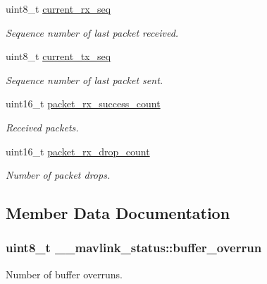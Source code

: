 \begin{DoxyCompactItemize}
uint8\+\_\+t \hyperlink{struct____mavlink__status_affbdd32b3dff8ae35327a79ed6b17646}{current\+\_\+rx\+\_\+seq}
\begin{DoxyCompactList}\small\item\em Sequence number of last packet received. \end{DoxyCompactList}\item 
uint8\+\_\+t \hyperlink{struct____mavlink__status_a06482d6c3fbfa829526c9b2e2e895f32}{current\+\_\+tx\+\_\+seq}
\begin{DoxyCompactList}\small\item\em Sequence number of last packet sent. \end{DoxyCompactList}\item 
uint16\+\_\+t \hyperlink{struct____mavlink__status_aa088f67773cdf9ff541c5880e65cee68}{packet\+\_\+rx\+\_\+success\+\_\+count}
\begin{DoxyCompactList}\small\item\em Received packets. \end{DoxyCompactList}\item 
uint16\+\_\+t \hyperlink{struct____mavlink__status_a1a1f510b9484e705c971f20fd1d61912}{packet\+\_\+rx\+\_\+drop\+\_\+count}
\begin{DoxyCompactList}\small\item\em Number of packet drops. \end{DoxyCompactList}\end{DoxyCompactItemize}


\subsection{Member Data Documentation}
\subsubsection[{\texorpdfstring{buffer\+\_\+overrun}{buffer_overrun}}]{\setlength{\rightskip}{0pt plus 5cm}uint8\+\_\+t \+\_\+\+\_\+mavlink\+\_\+status\+::buffer\+\_\+overrun}\hypertarget{struct____mavlink__status_ae0ceb5a136021ee78c953f2e86d772cb}{}\label{struct____mavlink__status_ae0ceb5a136021ee78c953f2e86d772cb}


Number of buffer overruns. 


